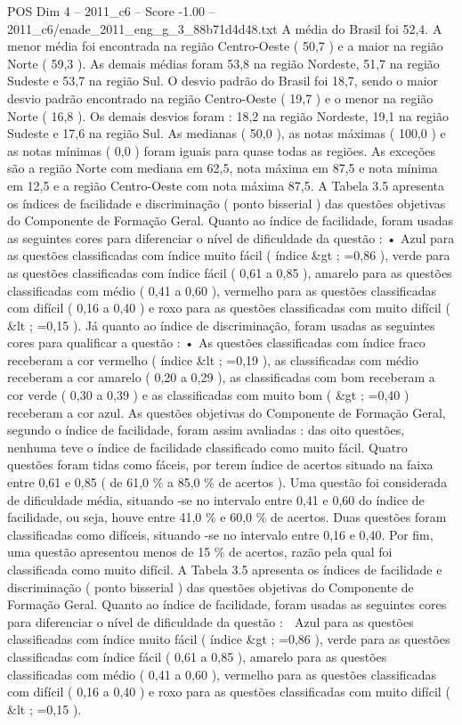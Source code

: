 \begin{textsample}{POS Dim 4 – 2011\_c6 – Score -1.00 – 2011\_c6/enade\_2011\_eng\_g\_3\_88b71d4d48.txt}
A média do Brasil foi 52,4.
A menor média foi encontrada na região Centro-Oeste ( 50,7 ) e a maior na região Norte ( 59,3 ).
As demais médias foram 53,8 na região Nordeste, 51,7 na região Sudeste e 53,7 na região Sul.
O desvio padrão do Brasil foi 18,7, sendo o maior desvio padrão encontrado na região Centro-Oeste ( 19,7 ) e o menor na região Norte ( 16,8 ).
Os demais desvios foram : 18,2 na região Nordeste, 19,1 na região Sudeste e 17,6 na região Sul.
As medianas ( 50,0 ), as notas máximas ( 100,0 ) e as notas mínimas ( 0,0 ) foram iguais para quase todas as regiões.
As exceções são a região Norte com mediana em 62,5, nota máxima em 87,5 e nota mínima em 12,5 e a região Centro-Oeste com nota máxima 87,5.
A Tabela 3.5 apresenta os índices de facilidade e discriminação ( ponto bisserial ) das questões objetivas do Componente de Formação Geral.
Quanto ao índice de facilidade, foram usadas as seguintes cores para diferenciar o nível de dificuldade da questão : • Azul para as questões classificadas com índice muito fácil ( índice \&gt ; =0,86 ), verde para as questões classificadas com índice fácil ( 0,61 a 0,85 ), amarelo para as questões classificadas com médio ( 0,41 a 0,60 ), vermelho para as questões classificadas com difícil ( 0,16 a 0,40 ) e roxo para as questões classificadas com muito difícil ( \&lt ; =0,15 ).
Já quanto ao índice de discriminação, foram usadas as seguintes cores para qualificar a questão : • As questões classificadas com índice fraco receberam a cor vermelho ( índice \&lt ; =0,19 ), as classificadas com médio receberam a cor amarelo ( 0,20 a 0,29 ), as classificadas com bom receberam a cor verde ( 0,30 a 0,39 ) e as classificadas com muito bom ( \&gt ; =0,40 ) receberam a cor azul.
As questões objetivas do Componente de Formação Geral, segundo o índice de facilidade, foram assim avaliadas : das oito questões, nenhuma teve o índice de facilidade classificado como muito fácil.
Quatro questões foram tidas como fáceis, por terem índice de acertos situado na faixa entre 0,61 e 0,85 ( de 61,0 \% a 85,0 \% de acertos ).
Uma questão foi considerada de dificuldade média, situando -se no intervalo entre 0,41 e 0,60 do índice de facilidade, ou seja, houve entre 41,0 \% e 60,0 \% de acertos.
Duas questões foram classificadas como difíceis, situando -se no intervalo entre 0,16 e 0,40.
Por fim, uma questão apresentou menos de 15 \% de acertos, razão pela qual foi classificada como muito difícil.
A Tabela 3.5 apresenta os índices de facilidade e discriminação ( ponto bisserial ) das questões objetivas do Componente de Formação Geral.
Quanto ao índice de facilidade, foram usadas as seguintes cores para diferenciar o nível de dificuldade da questão :  Azul para as questões classificadas com índice muito fácil ( índice \&gt ; =0,86 ), verde para as questões classificadas com índice fácil ( 0,61 a 0,85 ), amarelo para as questões classificadas com médio ( 0,41 a 0,60 ), vermelho para as questões classificadas com difícil ( 0,16 a 0,40 ) e roxo para as questões classificadas com muito difícil ( \&lt ; =0,15 ).

\end{textsample}
